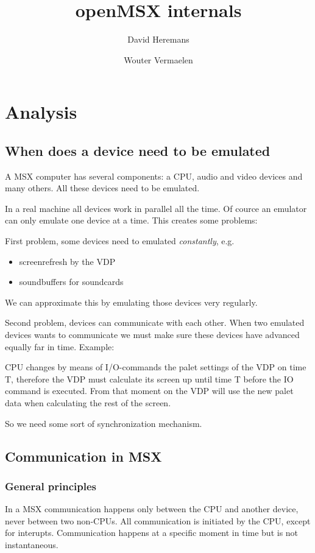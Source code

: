 \documentclass[11pt, a4paper]{report}
\title{openMSX internals}
\author{David Heremans}
\author{Wouter Vermaelen}
\begin{document}
\maketitle
\tableofcontents

\chapter{Analysis}

\section{When does a device need to be emulated}

A MSX computer has several components: a CPU, audio and video devices and
many others. All these devices need to be emulated.

In a real machine all devices work in parallel all the time. Of cource an
emulator can only emulate one device at a time. This creates some problems:

First problem, some devices need to emulated \textit{constantly}, e.g.
\begin{itemize}
\item screenrefresh by the VDP
\item soundbuffers for soundcards
\end{itemize}
We can approximate this by emulating those devices very regularly.

Second problem, devices can communicate with each other. When two emulated
devices wants to communicate we must make sure these devices have advanced
equally far in time. Example:

CPU changes by means of I/O-commands the palet settings of the VDP on
time T, therefore the VDP must calculate its screen up until time T before
the IO command is executed. From that moment on the VDP will use the new
palet data when calculating the rest of the screen.

So we need some sort of synchronization mechanism.


\section{Communication in MSX}

\subsection{General principles}

In a MSX communication happens only between the CPU and another device, never
between two non-CPUs. All communication is initiated by the CPU, except for
interupts. Communication happens at a specific moment in time but is not 
instantaneous.
\end{document}
